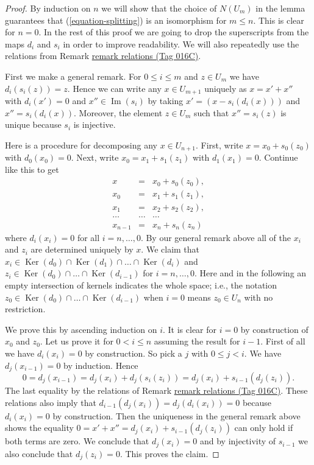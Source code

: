 \documentclass{amsart}
\theoremstyle{plain}
\theoremstyle{definition}
\theoremstyle{remark}
\numberwithin{equation}{subsection}
\def\Ker{\mathop{\mathrm{Ker}}}
\def\Im{\mathop{\mathrm{Im}}}
\begin{document}
\begin{proof}
By induction on $n$ we will show that the choice of $N(U_m)$
in the lemma guarantees that (\ref{equation-splitting}) is
an isomorphism for $m \leq n$. This is clear for $n = 0$.
In the rest of this proof we are going to
drop the superscripts from the maps $d_i$ and $s_i$ in order
to improve readability. We will also repeatedly use the relations
from Remark \href{https://stacks.math.columbia.edu/tag/016C}{remark relations (Tag 016C)}.

\medskip\noindent
First we make a general remark.
For $0 \leq i \leq m$ and $z \in U_m$ we have
$d_i(s_i(z)) = z$. Hence we can write
any $x \in U_{m + 1}$ uniquely as
$x = x' + x''$ with $d_i(x') = 0$
and $x'' \in \Im(s_i)$
by taking $x' = (x - s_i(d_i(x)))$ and
$x'' = s_i(d_i(x))$. Moreover, the element
$z \in U_m$ such that $x'' = s_i(z)$
is unique because $s_i$ is injective.

\medskip\noindent
Here is a procedure for decomposing any $x \in U_{n + 1}$.
First, write $x = x_0 + s_0(z_0)$ with $d_0(x_0) = 0$.
Next, write $x_0 = x_1 + s_1(z_1)$ with
$d_1(x_1) = 0$. Continue like this to get
\begin{eqnarray*}
x & = & x_0 + s_0(z_0), \\
x_0 & = & x_1 + s_1(z_1), \\
x_1 & = & x_2 + s_2(z_2), \\
\ldots & \ldots & \ldots \\
x_{n - 1} & = & x_n + s_n(z_n)
\end{eqnarray*}
where $d_i(x_i) = 0$ for all $i = n, \ldots, 0$.
By our general remark above all of the $x_i$
and $z_i$ are determined uniquely by $x$.
We claim that
$x_i \in
\Ker(d_0) \cap
\Ker(d_1) \cap
\ldots \cap
\Ker(d_i)$
and
$z_i \in
\Ker(d_0) \cap
\ldots \cap
\Ker(d_{i - 1})$
for $i = n, \ldots, 0$.
Here and in the following
an empty intersection of kernels indicates
the whole space; i.e.,
the notation
$z_0 \in \Ker(d_0) \cap
\ldots \cap
\Ker(d_{i - 1})$
when $i = 0$ means $z_0 \in U_n$ with no restriction.

\medskip\noindent
We prove this by ascending induction on $i$.
It is clear for $i = 0$ by construction of $x_0$ and $z_0$.
Let us prove it for $0 < i \leq n$ assuming the result for $i - 1$.
First of all we have $d_i(x_i) = 0$ by construction.
So pick a $j$ with $0 \leq j < i$. We have
$d_j(x_{i - 1}) = 0$ by induction. Hence
$$
0 = d_j(x_{i - 1})
= d_j(x_i) + d_j(s_i(z_i))
= d_j(x_i) + s_{i - 1}(d_j(z_i)).
$$
The last equality by the relations of Remark \href{https://stacks.math.columbia.edu/tag/016C}{remark relations (Tag 016C)}.
These relations also imply that
$d_{i - 1}(d_j(x_i)) = d_j(d_i(x_i)) = 0$
because $d_i(x_i)= 0$ by construction.
Then the uniqueness in the general remark above shows the equality
$0 = x' + x'' = d_j(x_i) + s_{i - 1}(d_j(z_i))$
can only hold if both terms are zero. We conclude that
$d_j(x_i) = 0$ and by injectivity of $s_{i - 1}$ we also
conclude that $d_j(z_i) = 0$. This proves the claim.


\end{proof}
\end{document}
